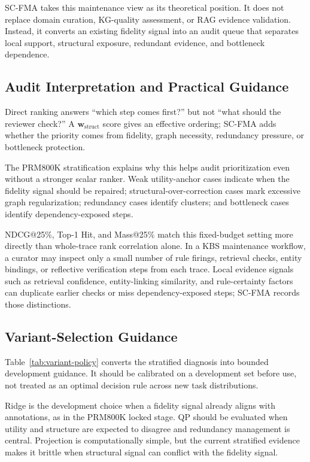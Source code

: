 \documentclass[a4paper,fleqn]{cas-sc}
\newcommand{\wstruct}{\ensuremath{\mathbf{w}_{\mathrm{struct}}}}
\begin{document}
SC-FMA takes this maintenance view as its theoretical position. It does not replace domain curation, KG-quality assessment, or RAG evidence validation. Instead, it converts an existing fidelity signal into an audit queue that separates local support, structural exposure, redundant evidence, and bottleneck dependence.

\subsection{Audit Interpretation and Practical Guidance}
\label{sec:audit-interpretation}

Direct ranking answers ``which step comes first?'' but not ``what should the reviewer check?'' A \wstruct{} score gives an effective ordering; SC-FMA adds whether the priority comes from fidelity, graph necessity, redundancy pressure, or bottleneck protection.

The PRM800K stratification explains why this helps audit prioritization even without a stronger scalar ranker. Weak utility-anchor cases indicate when the fidelity signal should be repaired; structural-over-correction cases mark excessive graph regularization; redundancy cases identify clusters; and bottleneck cases identify dependency-exposed steps.

NDCG@25\%, Top-1 Hit, and Mass@25\% match this fixed-budget setting more directly than whole-trace rank correlation alone. In a KBS maintenance workflow, a curator may inspect only a small number of rule firings, retrieval checks, entity bindings, or reflective verification steps from each trace. Local evidence signals such as retrieval confidence, entity-linking similarity, and rule-certainty factors can duplicate earlier checks or miss dependency-exposed steps; SC-FMA records those distinctions.

\subsection{Variant-Selection Guidance}

Table~\ref{tab:variant-policy} converts the stratified diagnosis into bounded development guidance. It should be calibrated on a development set before use, not treated as an optimal decision rule across new task distributions.

Ridge is the development choice when a fidelity signal already aligns with annotations, as in the PRM800K locked stage. QP should be evaluated when utility and structure are expected to disagree and redundancy management is central. Projection is computationally simple, but the current stratified evidence makes it brittle when structural signal can conflict with the fidelity signal.
\end{document}
